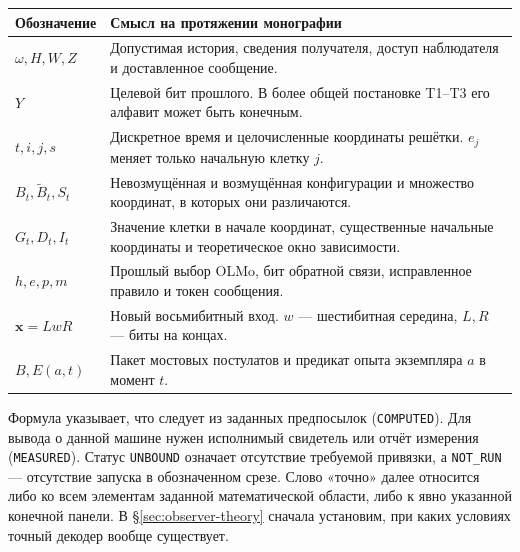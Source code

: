 \begin{center}\small
\begin{tabularx}{\linewidth}{@{}lX@{}}\toprule
Обозначение & Смысл на протяжении монографии \\\midrule
$\omega,H,W,Z$ & Допустимая история, сведения получателя, доступ наблюдателя и доставленное сообщение.\\
$Y$ & Целевой бит прошлого. В более общей постановке T1--T3 его алфавит может быть конечным.\\
$t,i,j,s$ & Дискретное время и целочисленные координаты решётки. $e_j$ меняет только начальную клетку $j$.\\
$B_t,\widetilde B_t,S_t$ & Невозмущённая и возмущённая конфигурации и множество координат, в которых они различаются.\\
$G_t,D_t,I_t$ & Значение клетки в начале координат, существенные начальные координаты и теоретическое окно зависимости.\\
$h,e,p,m$ & Прошлый выбор OLMo, бит обратной связи, исправленное правило и токен сообщения.\\
$\mathbf{x}=LwR$ & Новый восьмибитный вход. $w$ --- шестибитная середина, $L,R$ --- биты на концах.\\
$B,E(a,t)$ & Пакет мостовых постулатов и предикат опыта экземпляра $a$ в момент $t$.\\
\bottomrule\end{tabularx}
\end{center}

Формула указывает, что следует из заданных предпосылок (\texttt{COMPUTED}). Для вывода о данной машине нужен исполнимый свидетель или отчёт измерения (\texttt{MEASURED}). Статус \texttt{UNBOUND} означает отсутствие требуемой привязки, а \texttt{NOT\_RUN} --- отсутствие запуска в обозначенном срезе. Слово «точно» далее относится либо ко всем элементам заданной математической области, либо к явно указанной конечной панели. В §\ref{sec:observer-theory} сначала установим, при каких условиях точный декодер вообще существует.
